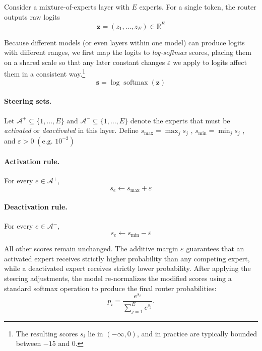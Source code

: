 \documentclass{article} %
\begin{document}
Consider a mixture‑of‑experts layer with $E$ experts.
For a single token, the router outputs raw logits
\begin{equation}
\mathbf z = (z_1,\dots,z_E) \in \mathbb{R}^E 
\label{eq:router_logits}
\end{equation}

Because different models (or even layers within one model) can produce logits with different ranges, we first map the logits to \emph{log-softmax} scores, placing them on a shared scale so that any later constant changes $\varepsilon$ we apply to logits affect them in a consistent way.\footnote{The resulting scores $s_i$ lie in $(-\infty, 0)$, and in practice are typically bounded between $-15$ and $0$.
}
\begin{equation}
\mathbf s =\log\operatorname{softmax}(\mathbf z)
\end{equation}


\paragraph{Steering sets.}
Let $\mathcal{A}^{+}\subseteq\{1,\dots,E\}$ and $\mathcal{A}^{-}\subseteq\{1,\dots,E\}$ denote the experts that must be \emph{activated} or \emph{deactivated} in this layer.
Define $s_{\max}=\max_{j} s_j$ , $s_{\min}=\min_{j} s_j$ , and $\varepsilon>0\;(\text{e.g. }10^{-2})$


\paragraph{Activation rule.}
For every $e\in\mathcal{A}^{+}$,
\begin{equation}
s_e \leftarrow s_{\max} + \varepsilon
\label{eq:activate}
\end{equation}

\paragraph{Deactivation rule.}
For every $e\in\mathcal{A}^{-}$,
\begin{equation}
s_e \leftarrow s_{\min} - \varepsilon
\label{eq:deactivate}
\end{equation}

All other scores remain unchanged. The additive margin $\varepsilon$ guarantees that an activated expert receives strictly higher probability than any competing expert, while a deactivated expert receives strictly lower probability. After applying the steering adjustments, the model re‑normalizes the modified scores using a standard softmax operation to produce the final router probabilities:
\begin{equation}
p_i = \frac{e^{s_i}}{\sum_{j=1}^E e^{s_j}}.
\label{eq:router_probs}
\end{equation}
\end{document}

